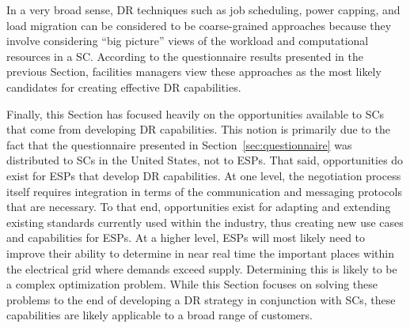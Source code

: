 In a very broad sense, DR techniques such as job
scheduling, power capping, and load migration can be considered to
be coarse-grained approaches because they involve considering ``big
picture'' views of the workload and computational resources in a
SC. According to the questionnaire results
presented in the previous Section, facilities managers view these
approaches as the most likely candidates for creating effective
DR capabilities.

Finally, this Section has focused heavily on the opportunities
available to SCs that come from developing
DR capabilities. This notion is primarily due to the
fact that the questionnaire presented in Section~\ref{sec:questionnaire}
was distributed to SCs in the United States, not to
ESPs. That said, opportunities do exist for
ESPs that develop DR
capabilities. At one level, the negotiation process itself requires
integration in terms of the communication and messaging protocols that
are necessary. To that end, opportunities exist for adapting and
extending existing standards currently used within the industry, thus
creating new use cases and capabilities for ESPs. At a higher level, ESPs will most
likely need to improve their ability to determine in near real time
the important places within the electrical grid where demands exceed
supply. Determining this is likely to be a complex optimization
problem. While this Section focuses on solving these problems to the
end of developing a DR strategy in conjunction with
SCs, these capabilities are likely applicable to a
broad range of customers.
